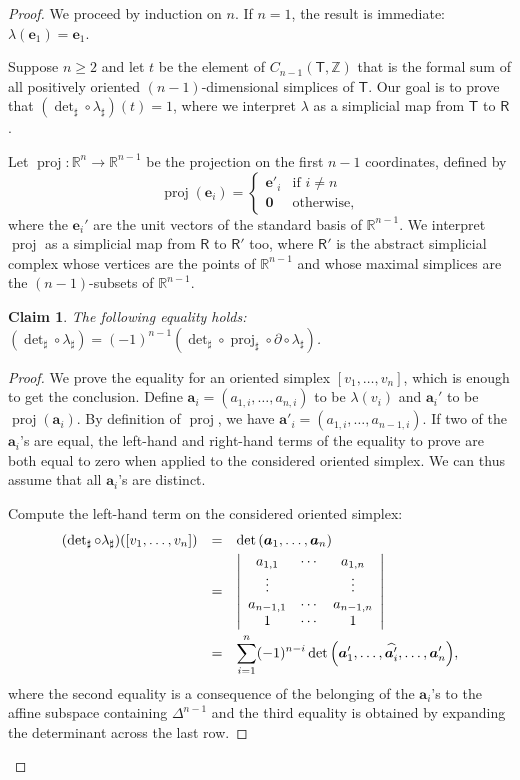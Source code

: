 \documentclass[12pt]{amsart}
\newtheorem*{claim}{Claim}
\theoremstyle{definition}
\theoremstyle{remark}
\def\R{\mathbb{R}}
\def\Rsf{\mathsf{R}}
\def\Z{\mathbb{Z}}
\def\T{\mathsf{T}}
\def\aa{\boldsymbol{a}}
\def\ee{\boldsymbol{e}}
\def\zero{\boldsymbol{0}}
\def\ds{\displaystyle}
\def\det{\operatorname{det}}
\def\proj{\operatorname{proj}}
\begin{document}
\begin{proof}
We proceed by induction on $n$. If $n=1$, the result is immediate: $\lambda(\ee_1)=\ee_1$.

Suppose $n\geq 2$ and let $t$ be the element of $C_{n-1}(\T,\Z)$ that is the formal sum of all positively oriented $(n-1)$-dimensional simplices of $\T$. Our goal is to prove that $(\det_{\sharp}\circ\lambda_{\sharp})(t)=1$, where we interpret $\lambda$ as a simplicial map from $\T$ to $\Rsf$.

Let $\proj\colon\R^n\rightarrow\R^{n-1}$ be the projection on the first $n-1$ coordinates, defined by
$$\proj(\ee_i)=\left\{\begin{array}{ll}\ee'_i& \mbox{if $i\neq n$} \\ \zero & \mbox{otherwise,}\end{array}\right.$$ where the $\ee_i'$ are the unit vectors of the standard basis of $\R^{n-1}$.
We interpret $\proj$ as a simplicial map from $\Rsf$ to $\Rsf'$ too, where $\Rsf'$ is the abstract simplicial complex whose vertices are the points of $\R^{n-1}$ and whose maximal simplices are the $(n-1)$-subsets of $\R^{n-1}$.

\begin{claim}
The following equality holds: $(\det_{\sharp}\circ\lambda_{\sharp})=(-1)^{n-1}(\det_{\sharp}\circ \proj_{\sharp}\circ\partial\circ \lambda_{\sharp})$.
\end{claim}

\begin{proof}
We prove the equality for an oriented simplex $[v_1,\ldots,v_n]$, which is enough to get the conclusion. Define $\aa_i=(a_{1,i},\ldots,a_{n,i})$ to be $\lambda(v_i)$ and $\aa_i'$ to be $\proj(\aa_i)$. By definition of $\proj$, we have  $\aa'_i=(a_{1,i},\ldots,a_{n-1,i})$. If two of the $\aa_i$'s are equal, the left-hand and right-hand terms of the equality to prove are both equal to zero when applied to the considered oriented simplex. We can thus assume that all $\aa_i$'s are distinct.

Compute the left-hand term on the considered oriented simplex: $$\begin{array}{rcl}
(\det_{\sharp}\circ\lambda_{\sharp})([v_1,\ldots,v_n]) & = & \ds{\det\left(\aa_1,\ldots,\aa_n\right)}\smallskip \\ 
& = & \ds{\left|\begin{array}{ccc} a_{1,1} & \cdots & a_{1,n} \\ \vdots & & \vdots \\ a_{n-1,1} & \cdots & a_{n-1,n} \\ 1 & \cdots & 1 \end{array}\right|}\smallskip\\
&  = & \ds{\sum_{i=1}^n(-1)^{n-i}\det\left(\aa'_1,\ldots,\widehat{\aa'_i},\ldots,\aa'_n\right)},
\end{array}
$$ where the second equality is a consequence of the belonging of the $\aa_i$'s to the affine subspace containing $\Delta^{n-1}$ and the third equality is obtained by expanding the determinant across the last row.


\end{proof}
\end{proof}
\end{document}
